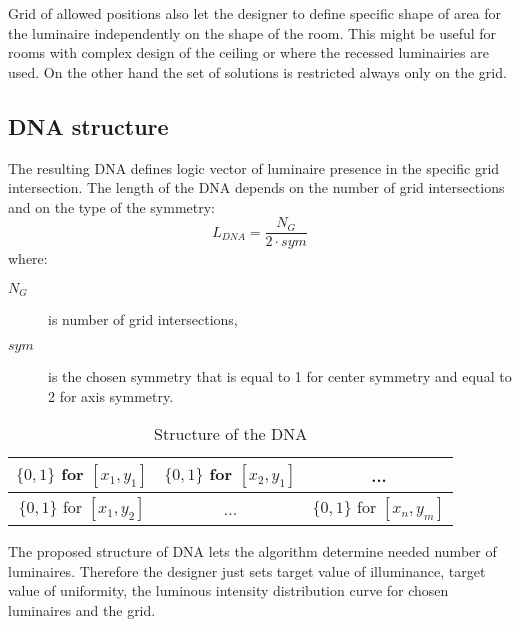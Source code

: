 Grid of allowed positions also let the designer to define specific shape of area for the luminaire independently on the shape of the room. This might be useful for rooms with complex design of the ceiling or where the recessed luminairies are used. On the other hand the set of solutions is restricted always only on the grid.

\subsection{DNA structure}
\label{ssec:dnaStruc}
The resulting DNA defines logic vector of luminaire presence in the specific grid intersection. The length of the DNA depends on the number of grid intersections and on the type of the symmetry:
\begin{equation}
\label{eq:DNALength}
L_{DNA} = \frac{N_G}{2\cdot sym}
\end{equation}
where:
\begin{description}
	\item[$N_G$] is number of grid intersections,
	\item[$sym$] is the chosen symmetry that is equal to 1 for center symmetry and equal to 2 for axis symmetry.
\end{description}

\begin{table}[htb]
	\renewcommand{\arraystretch}{1.3}
	\caption{Structure of the DNA}
 	\label{tab:strucDNA}
	\centering
  \begin{tabular}{| c | c | c |}
    \hline
    $\lbrace0,1\rbrace$ for $[x_1,y_1]$ & $\lbrace0,1\rbrace$ for $[x_2,y_1]$ & ... \\
    \hline
    $\lbrace0,1\rbrace$ for $[x_1,y_2]$ & ... & $\lbrace0,1\rbrace$ for $[x_n,y_m]$ \\
    \hline
  \end{tabular}
\end{table}

The proposed structure of DNA lets the algorithm determine needed number of luminaires. Therefore the designer just sets target value of illuminance, target value of uniformity, the luminous intensity distribution curve for chosen luminaires and the grid.